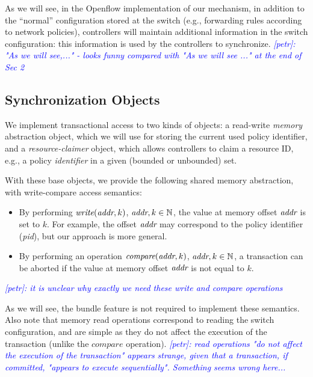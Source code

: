 \documentclass[conference]{sigcomm-alternate}
\newcommand{\Nat}{\mathbb{N}}
\newcommand{\compare}{compare\xspace}
\newcommand{\addr}{\emph{addr}\xspace}
\newcommand{\petr}[1]{\textit{\textcolor{blue}{[petr]: #1}}} %
\begin{document}
As we will see, in the Openflow implementation of our mechanism, 
in addition to the ``normal'' configuration stored at the switch
(e.g., forwarding rules according to network policies), 
controllers will maintain additional information 
in the switch configuration: this information is used by the
controllers to synchronize. 
\petr{"As we will see,..." - looks funny compared with "As we will see ..." at the end of Sec 2}
\subsection{Synchronization Objects}\label{sec:t-if}

We implement transactional access to  two kinds of objects:
a read-write \emph{memory} abstraction
object, which we will use for storing the current used policy identifier, and a
\emph{resource-claimer} object, which allows controllers to claim a resource ID,
e.g., a policy \emph{identifier} in a
given (bounded or unbounded) set.
%

With these base objects, we provide the following shared memory abstraction, with
write-compare access semantics:
\begin{itemize}
\item By performing $\textit{write}(\addr,k)$,
  $\addr,k\in\Nat$, the value at memory offset $\addr$ is set to $k$. For
  example, the offset $\addr$ may correspond to the policy identifier (\emph{pid}),
  but our approach is more general.

\item By performing an operation $\textit{\compare}(\addr,k)$, $\addr,k\in\Nat$,
a transaction can be aborted if the value at memory offset $\addr$ is not equal to $k$.
\end{itemize}

\petr{it is unclear why exactly we need these write and compare operations}

As we will see, the bundle feature is not required to implement these semantics.
Also note that memory read operations correspond to reading the switch
configuration, and are simple as they do not affect the execution of the transaction
(unlike the $\textit{\compare}$ operation). \petr{read operations "do not affect the execution of the transaction" appears strange, given that a transaction, if committed, "appears to execute sequentially". Something seems wrong here...}
\end{document}
